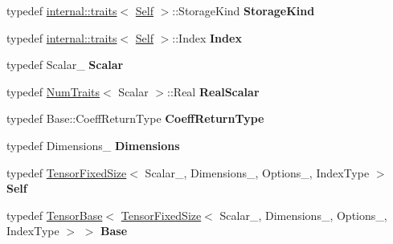 \begin{DoxyCompactItemize}
typedef \hyperlink{struct_eigen_1_1internal_1_1traits}{internal\+::traits}$<$ \hyperlink{class_eigen_1_1_tensor_fixed_size}{Self} $>$\+::Storage\+Kind {\bfseries Storage\+Kind}
\item 
\mbox{\label{class_eigen_1_1_tensor_fixed_size_a9f216e56b705771c41b13318ab4f0d9f}} 
typedef \hyperlink{struct_eigen_1_1internal_1_1traits}{internal\+::traits}$<$ \hyperlink{class_eigen_1_1_tensor_fixed_size}{Self} $>$\+::Index {\bfseries Index}
\item 
\mbox{\label{class_eigen_1_1_tensor_fixed_size_a279e84dd200f45087fd11be7ef8868af}} 
typedef Scalar\+\_\+ {\bfseries Scalar}
\item 
\mbox{\label{class_eigen_1_1_tensor_fixed_size_ad8c3a607bc14a360d373abf69054614e}} 
typedef \hyperlink{group___core___module_struct_eigen_1_1_num_traits}{Num\+Traits}$<$ Scalar $>$\+::Real {\bfseries Real\+Scalar}
\item 
\mbox{\label{class_eigen_1_1_tensor_fixed_size_a6e1bc5f90cc4c5d7f5e3d3ad3d2d06bd}} 
typedef Base\+::\+Coeff\+Return\+Type {\bfseries Coeff\+Return\+Type}
\item 
\mbox{\label{class_eigen_1_1_tensor_fixed_size_aa307b323caf82bd8629923bcd4a7632b}} 
typedef Dimensions\+\_\+ {\bfseries Dimensions}
\item 
\mbox{\label{class_eigen_1_1_tensor_fixed_size_a7a1b2d66554ac90311ed8da4b649f23a}} 
typedef \hyperlink{class_eigen_1_1_tensor_fixed_size}{Tensor\+Fixed\+Size}$<$ Scalar\+\_\+, Dimensions\+\_\+, Options\+\_\+, Index\+Type $>$ {\bfseries Self}
\item 
\mbox{\label{class_eigen_1_1_tensor_fixed_size_a265ab3158de7ea1fb7af56982a99f157}} 
typedef \hyperlink{class_eigen_1_1_tensor_base}{Tensor\+Base}$<$ \hyperlink{class_eigen_1_1_tensor_fixed_size}{Tensor\+Fixed\+Size}$<$ Scalar\+\_\+, Dimensions\+\_\+, Options\+\_\+, Index\+Type $>$ $>$ {\bfseries Base}
\item 
\mbox{\label{class_eigen_1_1_tensor_fixed_size_a493d8479135a88416b99aa83dec8d5fa}} 

\end{DoxyCompactItemize}
